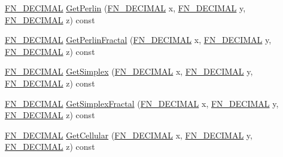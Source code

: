 \begin{DoxyCompactItemize}
\item 
\mbox{\hyperlink{_fast_noise_8h_a75a9ef6d2541c4921815b885bfd449c3}{F\+N\+\_\+\+D\+E\+C\+I\+M\+AL}} \mbox{\hyperlink{class_fast_noise_ac8379b662e050faf5302026616fc56af}{Get\+Perlin}} (\mbox{\hyperlink{_fast_noise_8h_a75a9ef6d2541c4921815b885bfd449c3}{F\+N\+\_\+\+D\+E\+C\+I\+M\+AL}} x, \mbox{\hyperlink{_fast_noise_8h_a75a9ef6d2541c4921815b885bfd449c3}{F\+N\+\_\+\+D\+E\+C\+I\+M\+AL}} y, \mbox{\hyperlink{_fast_noise_8h_a75a9ef6d2541c4921815b885bfd449c3}{F\+N\+\_\+\+D\+E\+C\+I\+M\+AL}} z) const
\item 
\mbox{\hyperlink{_fast_noise_8h_a75a9ef6d2541c4921815b885bfd449c3}{F\+N\+\_\+\+D\+E\+C\+I\+M\+AL}} \mbox{\hyperlink{class_fast_noise_a6f4a364104bbc65cda5135a904737de9}{Get\+Perlin\+Fractal}} (\mbox{\hyperlink{_fast_noise_8h_a75a9ef6d2541c4921815b885bfd449c3}{F\+N\+\_\+\+D\+E\+C\+I\+M\+AL}} x, \mbox{\hyperlink{_fast_noise_8h_a75a9ef6d2541c4921815b885bfd449c3}{F\+N\+\_\+\+D\+E\+C\+I\+M\+AL}} y, \mbox{\hyperlink{_fast_noise_8h_a75a9ef6d2541c4921815b885bfd449c3}{F\+N\+\_\+\+D\+E\+C\+I\+M\+AL}} z) const
\item 
\mbox{\hyperlink{_fast_noise_8h_a75a9ef6d2541c4921815b885bfd449c3}{F\+N\+\_\+\+D\+E\+C\+I\+M\+AL}} \mbox{\hyperlink{class_fast_noise_a4ab5e306f72c428fef0e69be3166c07d}{Get\+Simplex}} (\mbox{\hyperlink{_fast_noise_8h_a75a9ef6d2541c4921815b885bfd449c3}{F\+N\+\_\+\+D\+E\+C\+I\+M\+AL}} x, \mbox{\hyperlink{_fast_noise_8h_a75a9ef6d2541c4921815b885bfd449c3}{F\+N\+\_\+\+D\+E\+C\+I\+M\+AL}} y, \mbox{\hyperlink{_fast_noise_8h_a75a9ef6d2541c4921815b885bfd449c3}{F\+N\+\_\+\+D\+E\+C\+I\+M\+AL}} z) const
\item 
\mbox{\hyperlink{_fast_noise_8h_a75a9ef6d2541c4921815b885bfd449c3}{F\+N\+\_\+\+D\+E\+C\+I\+M\+AL}} \mbox{\hyperlink{class_fast_noise_a56b14e348cf0762010e6c58b6f5243f9}{Get\+Simplex\+Fractal}} (\mbox{\hyperlink{_fast_noise_8h_a75a9ef6d2541c4921815b885bfd449c3}{F\+N\+\_\+\+D\+E\+C\+I\+M\+AL}} x, \mbox{\hyperlink{_fast_noise_8h_a75a9ef6d2541c4921815b885bfd449c3}{F\+N\+\_\+\+D\+E\+C\+I\+M\+AL}} y, \mbox{\hyperlink{_fast_noise_8h_a75a9ef6d2541c4921815b885bfd449c3}{F\+N\+\_\+\+D\+E\+C\+I\+M\+AL}} z) const
\item 
\mbox{\hyperlink{_fast_noise_8h_a75a9ef6d2541c4921815b885bfd449c3}{F\+N\+\_\+\+D\+E\+C\+I\+M\+AL}} \mbox{\hyperlink{class_fast_noise_ae495c40690f86b4bf178580f1076a3a6}{Get\+Cellular}} (\mbox{\hyperlink{_fast_noise_8h_a75a9ef6d2541c4921815b885bfd449c3}{F\+N\+\_\+\+D\+E\+C\+I\+M\+AL}} x, \mbox{\hyperlink{_fast_noise_8h_a75a9ef6d2541c4921815b885bfd449c3}{F\+N\+\_\+\+D\+E\+C\+I\+M\+AL}} y, \mbox{\hyperlink{_fast_noise_8h_a75a9ef6d2541c4921815b885bfd449c3}{F\+N\+\_\+\+D\+E\+C\+I\+M\+AL}} z) const

\end{DoxyCompactItemize}
